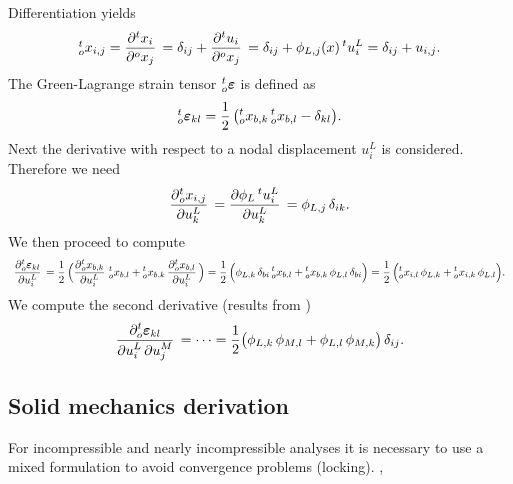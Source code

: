Differentiation yields
\begin{equation*}
  \begin{array}{lll}
    {}^t_ox_{i,j} = \p{{}^tx_i}{{}^ox_j} = \delta_{ij} + \p{{}^tu_i}{{}^ox_j} = \delta_{ij} + \phi_{L,j}(x)\,{}^tu_i^L = \delta_{ij} + u_{i,j}.
  \end{array}
\end{equation*}
The Green-Lagrange strain tensor ${}^t_o\boldsymbol{\varepsilon}$ is defined as 
\begin{equation*}
  \begin{array}{lll}
    {}^t_o \boldsymbol{\varepsilon}_{kl} = \displaystyle\frac{\displaystyle{1}}{\displaystyle{2}}\,\big({}^t_ox_{b,k}\,{}^t_ox_{b,l} - \delta_{kl}\big).
  \end{array}
\end{equation*}
Next the derivative with respect to a nodal displacement $u_i^L$ is considered. Therefore we need
\begin{equation*}
  \begin{array}{lll}
    \p{{}^t_ox_{i,j}}{u^L_k} = \p{\phi_L\,{}^tu_i^L}{u^L_k} = \phi_{L,j}\,\delta_{ik}.
  \end{array}
\end{equation*}
We then proceed to compute
\begin{equation*}
  \begin{array}{lll}
    \p{{}^t_o\bfeps_{kl}}{u^L_i} = \dfrac12\Big(\p{{}^t_ox_{b,k}}{u^L_i}\,{}^t_ox_{b,l} + {}^t_ox_{b,k}\,\p{{}^t_ox_{b,l}}{u^L_i}\Big) = \dfrac12\Big( \phi_{L,k}\,\delta_{bi} \,{}^t_ox_{b,l} + {}^t_ox_{b,k}\, \phi_{L,l}\,\delta_{bi}\Big) = \dfrac12\Big( {}^t_ox_{i,l}\,\phi_{L,k} + {}^t_ox_{i,k}\, \phi_{L,l}\Big).
  \end{array}
\end{equation*}
We compute the second derivative (results from \cite{SUSSMAN1987357})
\begin{equation*}
  \begin{array}{lll}
   \dfrac{\p ^t_o\bfeps_{kl}}{\p u^L_i\,\p u^M_j} = \dots = \frac12\big(\phi_{L,k}\,\phi_{M,l} + \phi_{L,l}\,\phi_{M,k}\big)\,\delta_{ij}.
  \end{array}
\end{equation*}

\subsection{Solid mechanics derivation}

For incompressible and nearly incompressible analyses it is necessary to use a mixed formulation to avoid convergence problems (locking). \cite{zienkiewicz1977finite}, \cite{bathe2006finite}

